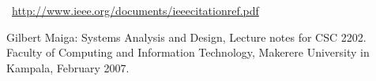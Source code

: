 \cleardoublepage
{}
{}
\begin{thebibliography}{99}

\ \url{http://www.ieee.org/documents/ieeecitationref.pdf}

Gilbert Maiga: Systems Analysis and Design, Lecture notes for CSC 2202. Faculty of Computing and Information Technology, Makerere University in Kampala, February 2007.

\end{thebibliography}
